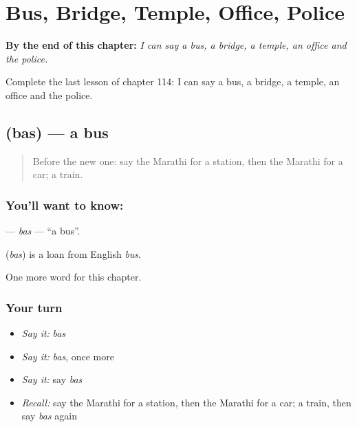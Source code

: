 
\chapter{Bus, Bridge, Temple, Office, Police}
\label{ch:mr-bus-bridge-temple-office-police}

\begin{chapteropening}
\textbf{By the end of this chapter:} \emph{I can say a bus, a bridge, a temple, an office and the police.}

Complete the last lesson of chapter 114: I can say a bus, a bridge, a temple, an office and the police.
\end{chapteropening}

\section[\texorpdfstring{\mr{बस} (bas)}{बस (bas)}]{ (bas) — a bus}

\label{lesson:MR-C114-bas}



\begin{quote}
Before the new one: say the Marathi for a station, then the Marathi for a car; a train.
\end{quote}

\subsection*{You'll want to know: }
\textbf{} — \emph{bas} — \textquotedblleft{}a bus\textquotedblright{}.

\begin{cousinweb}
\textbf{} (\emph{bas}) is a loan from English \emph{bus}.
\end{cousinweb}

\begin{grammarlens}[title={What you've built}]
One more word for this chapter.
\end{grammarlens}

\subsection*{Your turn}
\begin{itemize}
\raggedright
  \item \emph{Say it:} \emph{bas}
  \item \emph{Say it:} \emph{bas}, once more
  \item \emph{Say it:} say \emph{bas}
  \item \emph{Recall:} say the Marathi for a station, then the Marathi for a car; a train, then say \emph{bas} again
\end{itemize}

